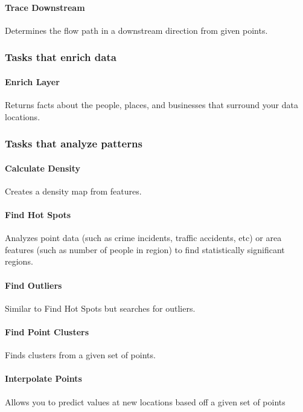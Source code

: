 \documentclass{vgtc}                          %
\begin{document}
\paragraph{Trace Downstream}
Determines the flow path in a downstream direction from given points.




\subsubsection{Tasks that enrich data}

\paragraph{Enrich Layer}
Returns facts about the people, places, and businesses that surround your data locations.





\subsubsection{Tasks that analyze patterns}

\paragraph{Calculate Density}
Creates a density map from features.

\paragraph{Find Hot Spots}
Analyzes point data (such as crime incidents, traffic accidents, etc) or area features (such as number of people in region) to find statistically significant regions.
 
\paragraph{Find Outliers}
Similar to Find Hot Spots but searches for outliers.

\paragraph{Find Point Clusters}
Finds clusters from a given set of points.

\paragraph{Interpolate Points}
Allows you to predict values at new locations based off a given set of points
\end{document}
